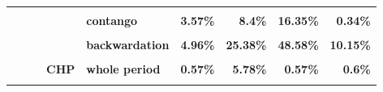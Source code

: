 \documentclass[
  authoryear,
  preprint,
  3p]{elsarticle}
\begin{document}
\begin{landscape}
\begin{longtable}[t]{>{}l>{}l>{}l>{}l>{}l>{}r>{}r>{}r>{}r}
\textbf{\cellcolor{gray!10}{}} & \textbf{\cellcolor{gray!10}{}} & \textbf{\cellcolor{gray!10}{}} & \textbf{\cellcolor{gray!10}{}} & \textbf{\cellcolor{gray!10}{backwardation}} & \textcolor[HTML]{4285f4}{\textbf{\cellcolor{gray!10}{1.5\%}}} & \textcolor[HTML]{4285f4}{\textbf{\cellcolor{gray!10}{6.51\%}}} & \textcolor[HTML]{4285f4}{\textbf{\cellcolor{gray!10}{13.24\%}}} & \textcolor[HTML]{4285f4}{\textbf{\cellcolor{gray!10}{0.33\%}}}\\
\textbf{} & \textbf{} & \textbf{} & \textbf{} & \textbf{contango} & \textcolor[HTML]{4285f4}{\textbf{3.57\%}} & \textcolor[HTML]{4285f4}{\textbf{8.4\%}} & \textcolor[HTML]{4285f4}{\textbf{16.35\%}} & \textcolor[HTML]{4285f4}{\textbf{0.34\%}}\\
\addlinespace
\textbf{\cellcolor{gray!10}{}} & \textbf{\cellcolor{gray!10}{}} & \textbf{\cellcolor{gray!10}{base}} & \textbf{\cellcolor{gray!10}{market}} & \textbf{\cellcolor{gray!10}{whole period}} & \textcolor[HTML]{4285f4}{\textbf{\cellcolor{gray!10}{5.39\%}}} & \textcolor[HTML]{4285f4}{\textbf{\cellcolor{gray!10}{23.13\%}}} & \textcolor[HTML]{4285f4}{\textbf{\cellcolor{gray!10}{50.77\%}}} & \textcolor[HTML]{4285f4}{\textbf{\cellcolor{gray!10}{19.74\%}}}\\
\textbf{} & \textbf{} & \textbf{} & \textbf{} & \textbf{backwardation} & \textcolor[HTML]{4285f4}{\textbf{4.96\%}} & \textcolor[HTML]{4285f4}{\textbf{25.38\%}} & \textcolor[HTML]{4285f4}{\textbf{48.58\%}} & \textcolor[HTML]{4285f4}{\textbf{10.15\%}}\\
\textbf{\cellcolor{gray!10}{}} & \textbf{\cellcolor{gray!10}{}} & \textbf{\cellcolor{gray!10}{}} & \textbf{\cellcolor{gray!10}{}} & \textbf{\cellcolor{gray!10}{contango}} & \textcolor[HTML]{4285f4}{\textbf{\cellcolor{gray!10}{5.66\%}}} & \textcolor[HTML]{4285f4}{\textbf{\cellcolor{gray!10}{21.55\%}}} & \textcolor[HTML]{4285f4}{\textbf{\cellcolor{gray!10}{52.45\%}}} & \textcolor[HTML]{4285f4}{\textbf{\cellcolor{gray!10}{27.5\%}}}\\
\textbf{} & \textbf{} & \textbf{} & \textbf{CHP} & \textbf{whole period} & \textcolor[HTML]{4285f4}{\textbf{0.57\%}} & \textcolor[HTML]{4285f4}{\textbf{5.78\%}} & \textcolor[HTML]{4285f4}{\textbf{0.57\%}} & \textcolor[HTML]{4285f4}{\textbf{0.6\%}}\\
\textbf{\cellcolor{gray!10}{}} & \textbf{\cellcolor{gray!10}{}} & \textbf{\cellcolor{gray!10}{}} & \textbf{\cellcolor{gray!10}{}} & \textbf{\cellcolor{gray!10}{backwardation}} & \textcolor[HTML]{4285f4}{\textbf{\cellcolor{gray!10}{1.4\%}}} & \textcolor[HTML]{4285f4}{\textbf{\cellcolor{gray!10}{5.18\%}}} & \textcolor[HTML]{4285f4}{\textbf{\cellcolor{gray!10}{1.91\%}}} & \textcolor[HTML]{4285f4}{\textbf{\cellcolor{gray!10}{0.29\%}}}\\

\end{longtable}
\end{landscape}
\end{document}
